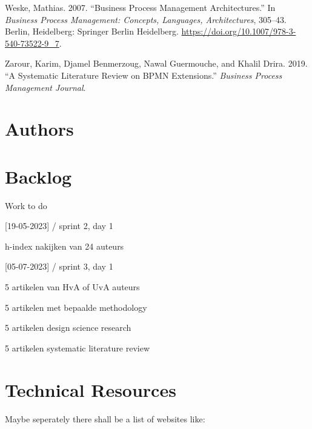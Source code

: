 \documentclass[
  letterpaper,
  DIV=11,
  numbers=noendperiod]{scrreprt}
\newlength{\cslhangindent}
\newlength{\cslentryspacingunit} %
\newenvironment{CSLReferences}[2] %
 {%
  \setlength{\parindent}{0pt}
  \ifodd #1
  \let\oldpar\par
  \def\par{\hangindent=\cslhangindent\oldpar}
  \fi
  \setlength{\parskip}{#2\cslentryspacingunit}
 }%
 {}
\begin{document}
\begin{CSLReferences}{1}{0}
\leavevmode{}%
Weske, Mathias. 2007. {``Business Process Management Architectures.''}
In \emph{Business Process Management: {Concepts}, Languages,
Architectures}, 305--43. {Berlin, Heidelberg}: {Springer Berlin
Heidelberg}. \url{https://doi.org/10.1007/978-3-540-73522-9_7}.

\leavevmode{}%
Zarour, Karim, Djamel Benmerzoug, Nawal Guermouche, and Khalil Drira.
2019. {``A Systematic Literature Review on {BPMN} Extensions.''}
\emph{Business Process Management Journal}.

\end{CSLReferences}


\hypertarget{authors}{%
\chapter*{Authors}\label{authors}}


\cleardoublepage
{}
{}
\appendix

\hypertarget{backlog}{%
\chapter{Backlog}\label{backlog}}

Work to do

\hfill\break

{[}19-05-2023{]} / sprint 2, day 1

h-index nakijken van 24 auteurs

{[}05-07-2023{]} / sprint 3, day 1

5 artikelen van HvA of UvA auteurs

5 artikelen met bepaalde methodology

5 artikelen design science research

5 artikelen systematic literature review

\newpage{}

\hypertarget{technical-resources}{%
\chapter{Technical Resources}\label{technical-resources}}

Maybe seperately there shall be a list of websites like:
\end{document}
